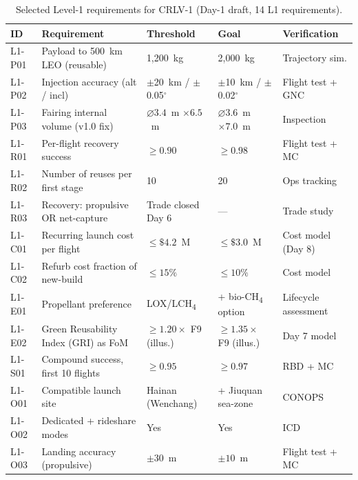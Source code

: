 \documentclass[10pt,a4paper]{article}
\begin{document}
\begin{table}[H]
\centering
\caption{Selected Level-1 requirements for CRLV-1 (Day-1 draft, 14 L1 requirements).}
\label{tab:L1}
\small
\begin{tabular}{@{}p{1.5cm}p{4.8cm}p{2.4cm}p{2.4cm}p{3.0cm}@{}}
\toprule
\textbf{ID} & \textbf{Requirement} & \textbf{Threshold} & \textbf{Goal} & \textbf{Verification} \\
\midrule
L1-P01 & Payload to 500~km LEO (reusable) & 1,200~kg & 2,000~kg & Trajectory sim. \\
L1-P02 & Injection accuracy (alt / incl) & $\pm$20~km / $\pm$0.05$^{\circ}$ & $\pm$10~km / $\pm$0.02$^{\circ}$ & Flight test + GNC \\
\rowcolor{novelrow}L1-P03 & Fairing internal volume (v1.0 fix) & $\varnothing 3.4$~m $\times 6.5$~m & $\varnothing 3.6$~m $\times 7.0$~m & Inspection \\
\addlinespace
L1-R01 & Per-flight recovery success & $\geq 0.90$ & $\geq 0.98$ & Flight test + MC \\
L1-R02 & Number of reuses per first stage & 10 & 20 & Ops tracking \\
\rowcolor{novelrow}L1-R03 & Recovery: propulsive OR net-capture & Trade closed Day 6 & --- & Trade study \\
\addlinespace
L1-C01 & Recurring launch cost per flight & $\leq \$4.2$~M & $\leq \$3.0$~M & Cost model (Day 8) \\
L1-C02 & Refurb cost fraction of new-build & $\leq 15\%$ & $\leq 10\%$ & Cost model \\
\addlinespace
L1-E01 & Propellant preference & LOX/LCH\textsubscript{4} & + bio-CH\textsubscript{4} option & Lifecycle assessment \\
\rowcolor{novelrow}L1-E02 & Green Reusability Index (GRI) as FoM & $\geq 1.20 \times$ F9 (illus.) & $\geq 1.35 \times$ F9 (illus.) & Day 7 model \\
\addlinespace
L1-S01 & Compound success, first 10 flights & $\geq 0.95$ & $\geq 0.97$ & RBD + MC \\
L1-O01 & Compatible launch site & Hainan (Wenchang) & + Jiuquan sea-zone & CONOPS \\
L1-O02 & Dedicated + rideshare modes & Yes & Yes & ICD \\
\rowcolor{novelrow}L1-O03 & Landing accuracy (propulsive) & $\pm 30$~m & $\pm 10$~m & Flight test + MC \\
\bottomrule
\end{tabular}
\end{table}
\end{document}

